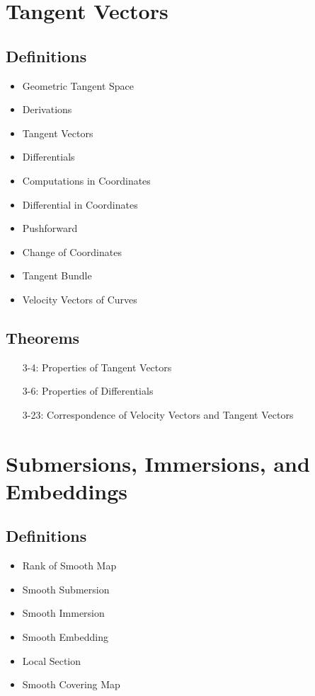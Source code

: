 \documentclass[11.5pt]{scrartcl}
\newcommand{\<}{\langle}
\renewcommand{\>}{\rangle}
\begin{document}
\section{Tangent Vectors}
\subsection{Definitions}
\begin{itemize}
\item Geometric Tangent Space
\item Derivations
\item Tangent Vectors 
\item Differentials
\item Computations in Coordinates
\item Differential in Coordinates
\item Pushforward
\item Change of Coordinates
\item Tangent Bundle
\item Velocity Vectors of Curves
\end{itemize}
\subsection{Theorems}
\begin{itemize}
\item[3-4:] Properties of Tangent Vectors
\item[3-6:] Properties of Differentials
\item[3-23:] Correspondence of Velocity Vectors and Tangent Vectors
\end{itemize}
\section{Submersions, Immersions, and Embeddings}


\subsection{Definitions}
\begin{itemize}
\item Rank of Smooth Map
\item Smooth Submersion
\item Smooth Immersion
\item Smooth Embedding
\item Local Section
\item Smooth Covering Map
\end{itemize}
\end{document}
